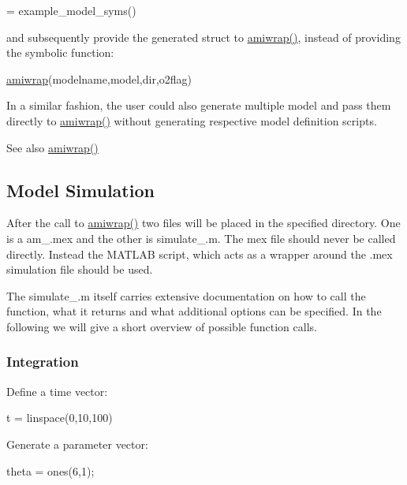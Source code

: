 \begin{DoxyCode}
[model] = example\_model\_syms() 
\end{DoxyCode}


and subsequently provide the generated struct to \hyperlink{amiwrap_8m_a183dd11adc4bd525147faa2590ea325b}{amiwrap()}, instead of providing the symbolic function\+:


\begin{DoxyCode}
\hyperlink{amiwrap_8m_a183dd11adc4bd525147faa2590ea325b}{amiwrap}(modelname,model,dir,o2flag)
\end{DoxyCode}


In a similar fashion, the user could also generate multiple model and pass them directly to \hyperlink{amiwrap_8m_a183dd11adc4bd525147faa2590ea325b}{amiwrap()} without generating respective model definition scripts.

\begin{DoxySeeAlso}{See also}
\hyperlink{amiwrap_8m_a183dd11adc4bd525147faa2590ea325b}{amiwrap()}
\end{DoxySeeAlso}
\hypertarget{def_simu_simulation}{}\subsection{Model Simulation}\label{def_simu_simulation}
After the call to \hyperlink{amiwrap_8m_a183dd11adc4bd525147faa2590ea325b}{amiwrap()} two files will be placed in the specified directory. One is a am\+\_.mex and the other is simulate\+\_.m. The mex file should never be called directly. Instead the M\+A\+T\+L\+A\+B script, which acts as a wrapper around the .mex simulation file should be used.

The simulate\+\_.m itself carries extensive documentation on how to call the function, what it returns and what additional options can be specified. In the following we will give a short overview of possible function calls.\hypertarget{def_simu_integration}{}\subsubsection{Integration}\label{def_simu_integration}
Define a time vector\+:


\begin{DoxyCode}
t = linspace(0,10,100)
\end{DoxyCode}


Generate a parameter vector\+:


\begin{DoxyCode}
theta = ones(6,1);
\end{DoxyCode}


